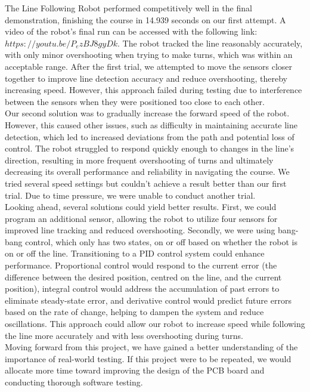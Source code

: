 \documentclass{article}
\begin{document}
The Line Following Robot performed competitively well in the final demonstration, finishing the course in 14.939 seconds on our first attempt. A video of the robot's final run can be accessed with the following link: \href{https://youtu.be/P_ezBJ8gyDk}{$https://youtu.be/P_ezBJ8gyDk$}. The robot tracked the line reasonably accurately, with only minor overshooting when trying to make turns, which was within an acceptable range. After the first trial, we attempted to move the sensors closer together to improve line detection accuracy and reduce overshooting, thereby increasing speed. However, this approach failed during testing due to interference between the sensors when they were positioned too close to each other. 
\\

Our second solution was to gradually increase the forward speed of the robot. However, this caused other issues, such as difficulty in maintaining accurate line detection, which led to increased deviations from the path and potential loss of control. The robot struggled to respond quickly enough to changes in the line’s direction, resulting in more frequent overshooting of turns and ultimately decreasing its overall performance and reliability in navigating the course. We tried several speed settings but couldn’t achieve a result better than our first trial. Due to time pressure, we were unable to conduct another trial. 
\\

Looking ahead, several solutions could yield better results. First, we could program an additional sensor, allowing the robot to utilize four sensors for improved line tracking and reduced overshooting. Secondly, we were using bang-bang control, which only has two states, on or off based on whether the robot is on or off the line. Transitioning to a PID control system could enhance performance. Proportional control would respond to the current error (the difference between the desired position, centred on the line, and the current position), integral control would address the accumulation of past errors to eliminate steady-state error, and derivative control would predict future errors based on the rate of change, helping to dampen the system and reduce oscillations. This approach could allow our robot to increase speed while following the line more accurately and with less overshooting during turns. 
\\

Moving forward from this project, we have gained a better understanding of the importance of real-world testing. If this project were to be repeated, we would allocate more time toward improving the design of the PCB board and conducting thorough software testing. 
\end{document}
